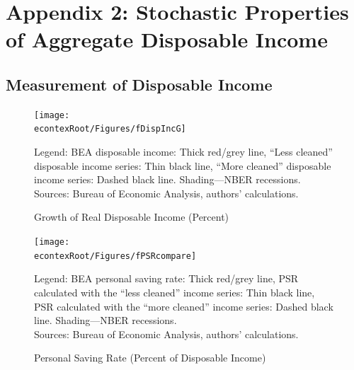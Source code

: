 \documentclass[titlepage]{\econtex}
\begin{document}
\section{Appendix 2: Stochastic Properties of Aggregate Disposable Income}

\subsection{Measurement of Disposable Income}

\hypertarget{fDispIncG}{}
\begin{figure}
\caption{Growth of Real Disposable Income (Percent) \label{fDispIncG}}
\texttt{[image: \\econtexRoot/Figures/fDispIncG]}

\footnotesize
Legend: BEA disposable income: Thick red/grey line,  ``Less cleaned'' disposable income series: Thin black line, ``More cleaned'' disposable income series: Dashed black line. Shading---NBER recessions.\\[0mm]
\tiny Sources: Bureau of Economic Analysis, authors' calculations.
\end{figure}

\hypertarget{fPSRcompare}{}
\begin{figure}
\caption{Personal Saving Rate (Percent of Disposable Income) \label{fPSRcompare}}
\texttt{[image: \\econtexRoot/Figures/fPSRcompare]}

\footnotesize
Legend: BEA personal saving rate: Thick red/grey line, PSR calculated with the ``less cleaned'' income series: Thin black line, PSR calculated with the ``more cleaned'' income series: Dashed black line. Shading---NBER recessions.\\[0mm]
\tiny Sources: Bureau of Economic Analysis, authors' calculations.
\end{figure}
\end{document}
